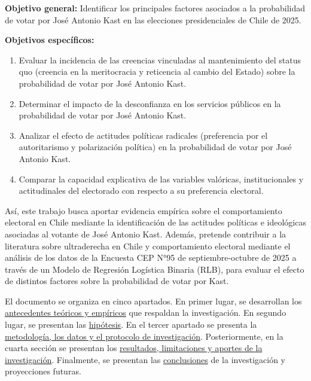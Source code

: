 \documentclass[
  spanish,
  a4paper,
  oneside]{scrbook}
\begin{document}
\textbf{Objetivo general:} Identificar los principales factores
asociados a la probabilidad de votar por José Antonio Kast en las
elecciones presidenciales de Chile de 2025.

\textbf{Objetivos específicos:}

\begin{enumerate}
\def\labelenumi{\arabic{enumi}.}
\item
  Evaluar la incidencia de las creencias vinculadas al mantenimiento del
  status quo (creencia en la meritocracia y reticencia al cambio del
  Estado) sobre la probabilidad de votar por José Antonio Kast.
\item
  Determinar el impacto de la desconfianza en los servicios públicos en
  la probabilidad de votar por José Antonio Kast.
\item
  Analizar el efecto de actitudes políticas radicales (preferencia por
  el autoritarismo y polarización política) en la probabilidad de votar
  por José Antonio Kast.
\item
  Comparar la capacidad explicativa de las variables valóricas,
  institucionales y actitudinales del electorado con respecto a su
  preferencia electoral.
\end{enumerate}

Así, este trabajo busca aportar evidencia empírica sobre el
comportamiento electoral en Chile mediante la identificación de las
actitudes políticas e ideológicas asociadas al votante de José Antonio
Kast. Además, pretende contribuir a la literatura sobre ultraderecha en
Chile y comportamiento electoral mediante el análisis de los datos de la
Encuesta CEP N°95 de septiembre-octubre de 2025 a través de un Modelo de
Regresión Logística Binaria (RLB), para evaluar el efecto de distintos
factores sobre la probabilidad de votar por Kast.

El documento se organiza en cinco apartados. En primer lugar, se
desarrollan los \href{02-antecedentes.qmd}{antecedentes teóricos y
empíricos} que respaldan la investigación. En segundo lugar, se
presentan las \href{03-hipotesis.qmd}{hipótesis}. En el tercer apartado
se presenta la \href{04-metodos.qmd}{metodología, los datos y el
protocolo de investigación}. Posteriormente, en la cuarta sección se
presentan los \href{05-resultados.qmd}{resultados, limitaciones y
aportes de la investigación}. Finalmente, se presentan las
\href{06-conclusiones.qmd}{conclusiones} de la investigación y
proyecciones futuras.

\end{document}
